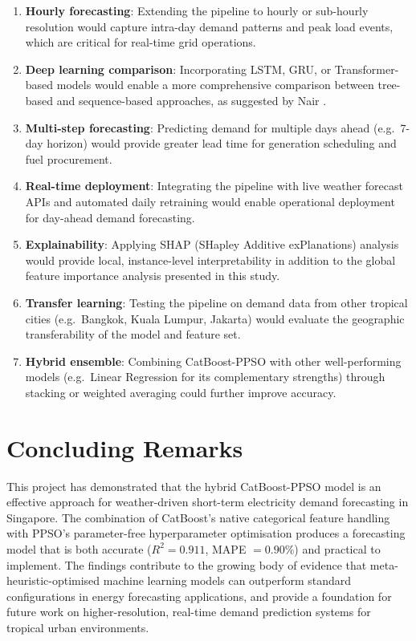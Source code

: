 \begin{enumerate}
    \item \textbf{Hourly forecasting}: Extending the pipeline to hourly or sub-hourly resolution would capture intra-day demand patterns and peak load events, which are critical for real-time grid operations.
    
    \item \textbf{Deep learning comparison}: Incorporating LSTM, GRU, or Transformer-based models would enable a more comprehensive comparison between tree-based and sequence-based approaches, as suggested by Nair \parencite{nair2025predicting}.
    
    \item \textbf{Multi-step forecasting}: Predicting demand for multiple days ahead (e.g.\ 7-day horizon) would provide greater lead time for generation scheduling and fuel procurement.
    
    \item \textbf{Real-time deployment}: Integrating the pipeline with live weather forecast APIs and automated daily retraining would enable operational deployment for day-ahead demand forecasting.
    
    \item \textbf{Explainability}: Applying SHAP (SHapley Additive exPlanations) analysis would provide local, instance-level interpretability in addition to the global feature importance analysis presented in this study.
    
    \item \textbf{Transfer learning}: Testing the pipeline on demand data from other tropical cities (e.g.\ Bangkok, Kuala Lumpur, Jakarta) would evaluate the geographic transferability of the model and feature set.
    
    \item \textbf{Hybrid ensemble}: Combining CatBoost-PPSO with other well-performing models (e.g.\ Linear Regression for its complementary strengths) through stacking or weighted averaging could further improve accuracy.
\end{enumerate}


\section{Concluding Remarks}

This project has demonstrated that the hybrid CatBoost-PPSO model is an effective approach for weather-driven short-term electricity demand forecasting in Singapore. The combination of CatBoost's native categorical feature handling with PPSO's parameter-free hyperparameter optimisation produces a forecasting model that is both accurate ($R^2 = 0.911$, MAPE $= 0.90\%$) and practical to implement. The findings contribute to the growing body of evidence that meta-heuristic-optimised machine learning models can outperform standard configurations in energy forecasting applications, and provide a foundation for future work on higher-resolution, real-time demand prediction systems for tropical urban environments.